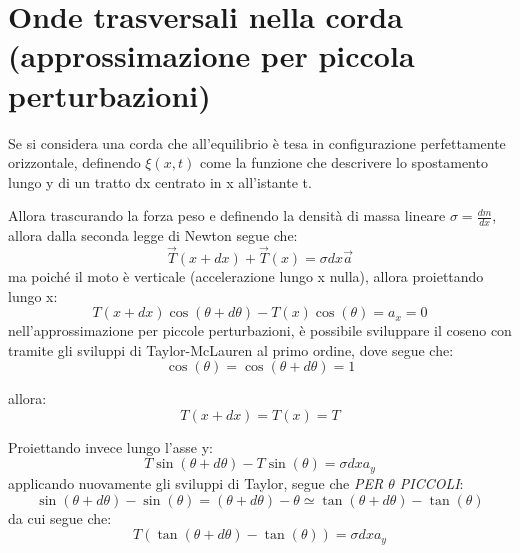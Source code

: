 \documentclass[11pt, a4paper, openright]{book}
\theoremstyle{plain}
\theoremstyle{definition}
\begin{document}

\section{Onde trasversali nella corda (approssimazione per piccola perturbazioni)}
Se si considera una corda che all'equilibrio è tesa in configurazione perfettamente orizzontale, definendo $\xi(x, t)$ come la funzione che descrivere lo spostamento lungo y di un tratto dx centrato in x all'istante t.

Allora trascurando la forza peso e definendo la densità di massa lineare $\sigma = \frac{dm}{dx}$, allora dalla seconda legge di Newton segue che:
\begin{equation}
    \vec{T}(x + dx) + \vec{T}(x) = \sigma dx \vec{a}
\end{equation} 
ma poiché il moto è verticale (accelerazione lungo x nulla), allora proiettando lungo x:
\begin{equation}
    T(x + dx)\cos(\theta + d\theta) - T(x)\cos(\theta) = a_x = 0
\end{equation}
nell'approssimazione per piccole perturbazioni, è possibile sviluppare il coseno con tramite gli sviluppi di Taylor-McLauren al primo ordine, dove segue che:
\begin{equation}
    \cos(\theta) = \cos(\theta + d\theta) = 1
\end{equation}

allora:
\begin{equation}
    T(x + dx) = T(x) = T
\end{equation}

Proiettando invece lungo l'asse y:
\begin{equation}
    T\sin(\theta + d\theta) - T\sin(\theta) = \sigma dx a_y
\end{equation}
applicando nuovamente gli sviluppi di Taylor, segue che \textit{PER $\theta$ PICCOLI}:
\begin{equation}
    \sin(\theta + d\theta) - \sin(\theta) = (\theta + d\theta) - \theta \simeq \tan(\theta + d\theta) - \tan(\theta)
\end{equation}
da cui segue che:
\begin{equation}
    T(\tan(\theta + d\theta) - \tan(\theta)) = \sigma dx a_y
\end{equation}
\end{document}
